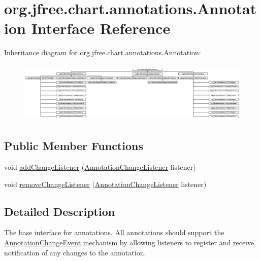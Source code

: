 \hypertarget{interfaceorg_1_1jfree_1_1chart_1_1annotations_1_1_annotation}{}\section{org.\+jfree.\+chart.\+annotations.\+Annotation Interface Reference}
\label{interfaceorg_1_1jfree_1_1chart_1_1annotations_1_1_annotation}
Inheritance diagram for org.\+jfree.\+chart.\+annotations.\+Annotation\+:\begin{figure}[H]
\begin{center}
\leavevmode
\includegraphics[height=2.944785cm]{interfaceorg_1_1jfree_1_1chart_1_1annotations_1_1_annotation}
\end{center}
\end{figure}
\subsection*{Public Member Functions}
\begin{DoxyCompactItemize}
\item 
void \mbox{\hyperlink{interfaceorg_1_1jfree_1_1chart_1_1annotations_1_1_annotation_aea28c7e0fd5dfce175da8303f85d449a}{add\+Change\+Listener}} (\mbox{\hyperlink{interfaceorg_1_1jfree_1_1chart_1_1event_1_1_annotation_change_listener}{Annotation\+Change\+Listener}} listener)
\item 
void \mbox{\hyperlink{interfaceorg_1_1jfree_1_1chart_1_1annotations_1_1_annotation_a3ecdf612567af2d1d4cb2344c47db120}{remove\+Change\+Listener}} (\mbox{\hyperlink{interfaceorg_1_1jfree_1_1chart_1_1event_1_1_annotation_change_listener}{Annotation\+Change\+Listener}} listener)
\end{DoxyCompactItemize}


\subsection{Detailed Description}
The base interface for annotations. All annotations should support the \mbox{\hyperlink{}{Annotation\+Change\+Event}} mechanism by allowing listeners to register and receive notification of any changes to the annotation.

